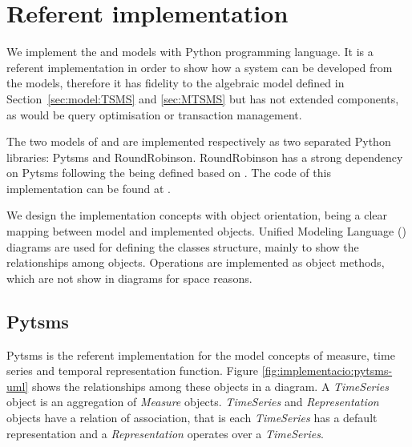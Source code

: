 


\section{Referent implementation}
\label{sec:implementation}

We implement the  and  models with Python
\cite{python:doc2} programming language. It is a referent
implementation in order to show how a system can be developed from the
models, therefore it has fidelity to the algebraic model defined in
Section~\ref{sec:model:TSMS} and \ref{sec:MTSMS} but has not extended
 components, as would be query optimisation or
transaction management.

The two models of  and  are implemented
respectively as two separated Python libraries: Pytsms and
RoundRobinson.  RoundRobinson has a strong dependency on Pytsms
following the  being defined based on .  The
code of this implementation can be found at
\cite{llusa:roundrobinson}.

We design the implementation concepts with object orientation, being a
clear mapping between model and implemented objects. Unified Modeling
Language () diagrams are used for defining the classes
structure, mainly to show the relationships among objects.  Operations
are implemented as object methods, which are not show in 
diagrams for space reasons.




\subsection{Pytsms}

Pytsms is the referent implementation for the model concepts of
measure, time series and temporal representation function.  Figure
\ref{fig:implementacio:pytsms-uml} shows the relationships among these
objects in a  diagram. A \emph{TimeSeries} object is an
aggregation of \emph{Measure} objects. \emph{TimeSeries} and
\emph{Representation} objects have a relation of association, that is
each \emph{TimeSeries} has a default representation and a
\emph{Representation} operates over a \emph{TimeSeries}.


